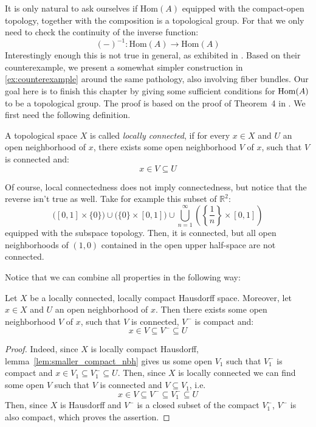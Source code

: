 It is only natural to ask ourselves if $\mathrm{Hom}(A)$ equipped with the compact-open topology, together with the composition is a topological group. For that we only need to check the continuity of the inverse function:
\[(-)^{-1}:\mathrm{Hom}(A)\to\mathrm{Hom}(A)\]
Interestingly enough this is not true in general, as exhibited in \cite{counterexample}. Based on their counterexample, we present a somewhat simpler construction in \ref{ex:counterexample} around the same pathology, also involving fiber bundles. Our goal here is to finish this chapter by giving some sufficient conditions for $\mathrm{Hom}(A)$ to be a topological group. The proof is based on the proof of Theorem~4 in \cite{top_group}. We first need the following definition.

\begin{definition} A topological space $X$ is called \emph{locally connected}, if for every $x\in X$ and $U$ an open neighborhood of $x$, there exists some open neighborhood $V$ of $x$, such that $V$ is connected and:
\[x\in V\subseteq U\]
\end{definition}
\begin{remark} Of course, local connectedness does not imply connectedness, but notice that the reverse isn't true as well. Take for example this subset of $\mathbb{R}^2$: \[\big([0,1]\times\{0\}\big)\cup\big(\{0\}\times[0,1]\big)\cup\bigcup_{n=1}^{\infty}\left(\left\{\frac{1}{n}\right\}\times[0,1]\right)\]
equipped with the subspace topology. Then, it is connected, but all open neighborhoods of $(1,0)$ contained in the open upper half-space are not connected.
\end{remark}
Notice that we can combine all properties in the following way:
\begin{lemma}\label{lem:nice_local_base} Let $X$ be a locally connected, locally compact Hausdorff space. Moreover, let $x\in X$ and $U$ an open neighborhood of $x$. Then there exists some open neighborhood $V$ of $x$, such that $V$ is connected, $V^-$ is compact and:
\[x\in V\subseteq V^-\subseteq U\]
\end{lemma}
\begin{proof} Indeed, since $X$ is locally compact Hausdorff, lemma~\ref{lem:smaller_compact_nbh} gives us some open $V_1$ such that $V_1^-$ is compact and $x\in V_1\subseteq V_1^-\subseteq U$. Then, since $X$ is locally connected we can find some open $V$ such that $V$ is connected and $V\subseteq V_1$, i.e.
\[x\in V\subseteq V^-\subseteq V_1^-\subseteq U\]
Then, since $X$ is Hausdorff and $V^-$ is a closed subset of the compact $V_1^-$, $V^-$ is also compact, which proves the assertion.
\end{proof}
